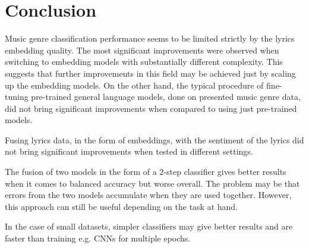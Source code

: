 \section{Conclusion}\label{conclusion}

Music genre classification performance seems to be limited strictly by the lyrics embedding quality. The most significant improvements were observed when switching to embedding models with substantially different complexity. This suggests that further improvements in this field may be achieved just by scaling up the embedding models. 
On the other hand, the typical procedure of fine-tuning pre-trained general language models, done  on presented music genre data, did not bring significant improvements when compared to using just pre-trained models.

Fusing lyrics data, in the form of embeddings, with the sentiment of the lyrics did not bring significant improvements when tested in different settings.

The fusion of two models in the form of a 2-step classifier gives better results when it comes to balanced accuracy but worse overall. The problem may be that errors from the two models accumulate when they are used together. However, this approach can still be useful depending on the task at hand.

In the case of small datasets, simpler classifiers may give better results and are faster than training e.g. CNNs for multiple epochs.
 
